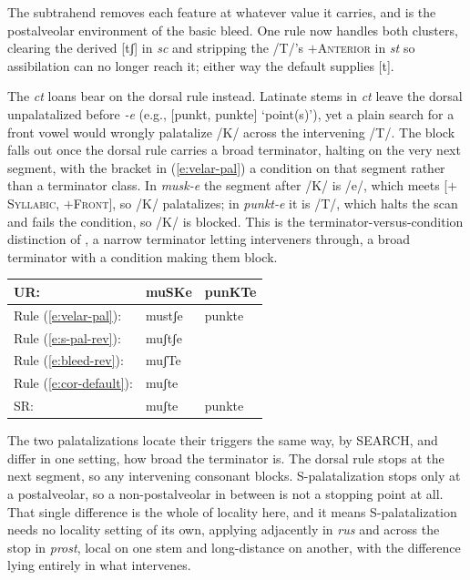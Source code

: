 \documentclass[11pt,letterpaper]{article}
\newcommand{\word}[1]{\textit{#1}}
\newcommand{\featspec}[2]{\ensuremath{#1}\textsc{#2}}
\newcommand*\circled[1]{\tikz[baseline=(char.base)]{
            \node[shape=circle,draw,inner sep=2pt] (char) {#1};}}
\begin{document}
\noindent
The subtrahend removes each feature at whatever value it carries, and \circled{S} is the postalveolar environment of the basic bleed.
One rule now handles both clusters, clearing the derived [tʃ] in \word{sc} and stripping the /T/'s \featspec{+}{Anterior} in \word{st} so assibilation can no longer reach it; either way the default supplies [t].

\bigskip\noindent
The \word{ct} loans bear on the dorsal rule instead.
Latinate stems in \word{ct} leave the dorsal unpalatalized before \word{-e} (e.g., [punkt, punkte] `point(s)'), yet a plain search for a front vowel would wrongly palatalize /K/ across the intervening /T/.
The block falls out once the dorsal rule carries a broad terminator, halting on the very next segment, with the bracket in (\ref{e:velar-pal}) a condition on that segment rather than a terminator class.
In \word{musk-e} the segment after /K/ is /e/, which meets [\featspec{+}{Syllabic}, \featspec{+}{Front}], so /K/ palatalizes; in \word{punkt-e} it is /T/, which halts the scan and fails the condition, so /K/ is blocked.
This is the terminator-versus-condition distinction of \citet{Dabbous:EtAl:21,Dabbous:EtAl:24}, a narrow terminator letting interveners through, a broad terminator with a condition making them block.

\begin{unlabeledexample}
\begin{tabular}{l ll}
UR:                         & muSKe   & punKTe \\
\midrule
Rule (\ref{e:velar-pal}):   & mustʃe  & punkte \\
Rule (\ref{e:s-pal-rev}):   & muʃtʃe  &        \\
Rule (\ref{e:bleed-rev}):   & muʃTe   &        \\
Rule (\ref{e:cor-default}): & muʃte   &        \\
\midrule
SR:                         & muʃte   & punkte \\
\end{tabular}
\label{e:cluster-derivation}
\end{unlabeledexample}

\bigskip\noindent
The two palatalizations locate their triggers the same way, by SEARCH, and differ in one setting, how broad the terminator is.
The dorsal rule stops at the next segment, so any intervening consonant blocks.
S-palatalization stops only at a postalveolar, so a non-postalveolar in between is not a stopping point at all.
That single difference is the whole of locality here, and it means S-palatalization needs no locality setting of its own, applying adjacently in \word{rus} and across the stop in \word{prost}, local on one stem and long-distance on another, with the difference lying entirely in what intervenes.
\end{document}
